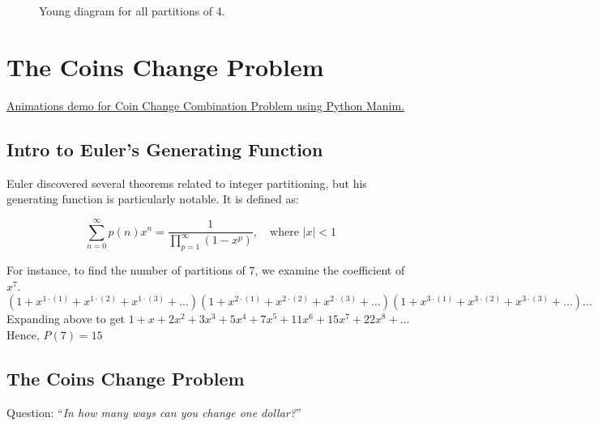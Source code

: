 \documentclass{article}
\begin{document}
\begin{figure}[h]
\centering
{}
\caption{Young diagram for all partitions of 4.}
\end{figure}


\newpage
\section{The Coins Change Problem}

\noindent \href{https://youtu.be/PmR1eRswj3A}{Animations demo for Coin Change Combination Problem using Python Manim.}\cite{manim}


\subsection{Intro to Euler's Generating Function}
Euler discovered several theorems related to integer partitioning, but his generating function is particularly notable. It is defined as:

\[
\sum_{n=0}^{\infty} p(n) x^n = \frac{1}{\prod_{p=1}^{\infty} (1-x^p)}, \quad \text{where } |x| < 1
\]

\noindent For instance, to find the number of partitions of 7, we examine the coefficient of \(x^7\).
\[
(1 + x^{1\cdot(1)} + x^{1\cdot(2)} + x^{1\cdot(3)} + \ldots )(1 + x^{2\cdot(1)} + x^{2\cdot(2)} + x^{2\cdot(3)} + \ldots )(1 + x^{3\cdot(1)} + x^{3\cdot(2)} + x^{3\cdot(3)} + \ldots ) \ldots
\]
Expanding above to get \(1 + x + 2x^2 + 3x^3 + 5x^4 + 7x^5 + 11x^6 + 15x^7 + 22x^8 + \ldots\)
\newline
\newline
\noindent Hence, \(P(7)=15\)


\subsection{The Coins Change Problem}
\begin{center}
    Question:
    “\textit{In how many ways can you change one dollar?}” \cite{gpolya1956}
\end{center}
\end{document}
